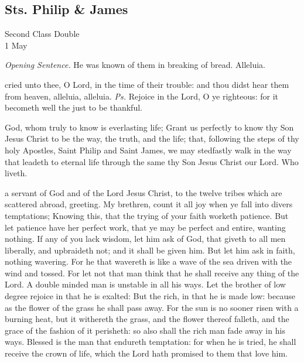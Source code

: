 \subsection{Sts. Philip \& James}
\begin{inhead}
    {Second Class Double\\
1 May}
\end{inhead}
\par\noindent
\textit{Opening Sentence.} He was known of them in breaking of bread. Alleluia.\par

\introit
{} cried unto thee, O Lord, in the time of their trouble: and thou didst hear them from heaven, alleluia, alleluia. \textit{Ps.} Rejoice in the Lord, O ye righteous: for it becometh well the just to be thankful.

\collect
{} God, whom truly to know is everlasting life; Grant us perfectly to know thy Son Jesus Christ to be the way, the truth, and the life; that, following the steps of thy holy Apostles, Saint Philip and Saint James, we may stedfastly walk in the way that leadeth to eternal life through the same thy Son Jesus Christ our Lord. Who liveth.

 a servant of God and of the Lord Jesus Christ, to the twelve tribes which are scattered abroad, greeting. My brethren, count it all joy when ye fall into divers temptations; Knowing this, that the trying of your faith worketh patience. But let patience have her perfect work, that ye may be perfect and entire, wanting nothing. If any of you lack wisdom, let him ask of God, that giveth to all men liberally, and upbraideth not; and it shall be given him. But let him ask in faith, nothing wavering. For he that wavereth is like a wave of the sea driven with the wind and tossed. For let not that man think that he shall receive any thing of the Lord. A double minded man is unstable in all his ways. Let the brother of low degree rejoice in that he is exalted: But the rich, in that he is made low: because as the flower of the grass he shall pass away. For the sun is no sooner risen with a burning heat, but it withereth the grass, and the flower thereof falleth, and the grace of the fashion of it perisheth: so also shall the rich man fade away in his ways. Blessed is the man that endureth temptation: for when he is tried, he shall receive the crown of life, which the Lord hath promised to them that love him.

